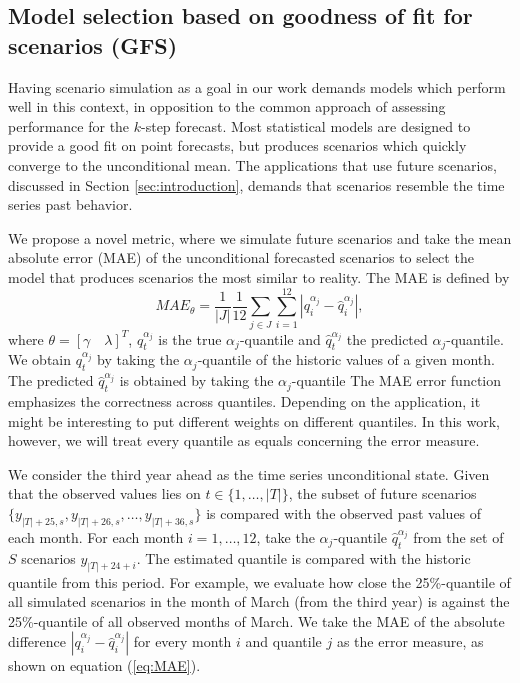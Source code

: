 \subsection{Model selection based on goodness of fit for scenarios (GFS)} \label{sec:GFS}

Having scenario simulation as a goal in our work demands models which perform well in this context, in opposition to the common approach of assessing performance for the $k$-step forecast.  Most statistical models are designed to provide a good fit on point forecasts, but produces scenarios which quickly converge to the unconditional mean.
The applications that use future scenarios, discussed in Section \ref{sec:introduction}, demands that scenarios resemble the time series past behavior.

We propose a novel metric, where we simulate future scenarios and take the mean absolute error (MAE) of the unconditional forecasted scenarios to select the model that produces scenarios the most similar to reality.
The MAE is defined by
\begin{equation}
MAE_{\theta}= \frac{1}{|J|} \frac{1}{12} \sum_{j \in J} \sum_{i = 1}^{12}  \left| q_i^{\alpha_{j}}- \hat q_i^{\alpha_{j}}  \right|,
\label{eq:MAE}
\end{equation}
where $\theta = [\gamma \quad \lambda]^T$, $q_t^{\alpha_{j}}$ is the true $\alpha_j$-quantile  and $\hat q_t^{\alpha_j}$ the predicted $\alpha_j$-quantile. We obtain $q_t^{\alpha_j}$ by taking the $\alpha_j$-quantile of the historic values of a given month. The predicted $\hat q_t^{\alpha_j}$ is obtained by taking the $\alpha_j$-quantile 
The MAE error function emphasizes the correctness across quantiles. Depending on the application, it might be interesting to put different weights on different quantiles. In this work, however, we will treat every quantile as equals concerning the error measure.

We consider the third year ahead as the time series unconditional state. Given that the observed values lies on $t \in \{1,\dots,|T| \}$, the subset of future scenarios $\{y_{|T|+25,s}, y_{|T|+26,s}, \dots, y_{|T|+36,s} \}$ is compared with the observed past values of each month. 
For each month $i = 1,\dots, 12$, take the $\alpha_j$-quantile $\hat q_t^{\alpha_j}$ from the set of $S$ scenarios $y_{|T|+24+i}$. The estimated quantile is compared with the historic quantile from this period. For example, we evaluate how close the 25\%-quantile
of all simulated scenarios in the month of March (from the third year) is against the 25\%-quantile
of all observed months of March. We take the MAE of the absolute difference $\left| q_i^{\alpha_{j}}- \hat q_i^{\alpha_{j}}  \right|$ for every month $i$ and quantile $j$ as the error measure, as shown on equation (\ref{eq:MAE}).

